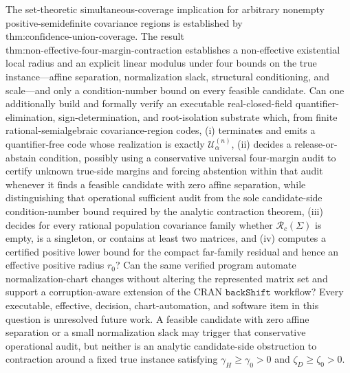 The set-theoretic simultaneous-coverage implication for arbitrary nonempty positive-semidefinite covariance regions is established by \(\text{thm:confidence-union-coverage}\). The result \(\text{thm:non-effective-four-margin-contraction}\) establishes a non-effective existential local radius and an explicit linear modulus under four bounds on the true instance---affine separation, normalization slack, structural conditioning, and scale---and only a condition-number bound on every feasible candidate. Can one additionally build and formally verify an executable real-closed-field quantifier-elimination, sign-determination, and root-isolation substrate which, from finite rational-semialgebraic covariance-region codes, (i) terminates and emits a quantifier-free code whose realization is exactly \(\mathcal U^{(n)}_\alpha\), (ii) decides a release-or-abstain condition, possibly using a conservative universal four-margin audit to certify unknown true-side margins and forcing abstention within that audit whenever it finds a feasible candidate with zero affine separation, while distinguishing that operational sufficient audit from the sole candidate-side condition-number bound required by the analytic contraction theorem, (iii) decides for every rational population covariance family whether \(\mathcal R_c(\Sigma)\) is empty, is a singleton, or contains at least two matrices, and (iv) computes a certified positive lower bound for the compact far-family residual and hence an effective positive radius \(r_0\)? Can the same verified program automate normalization-chart changes without altering the represented matrix set and support a corruption-aware extension of the CRAN \(\texttt{backShift}\) workflow? Every executable, effective, decision, chart-automation, and software item in this question is unresolved future work. A feasible candidate with zero affine separation or a small normalization slack may trigger that conservative operational audit, but neither is an analytic candidate-side obstruction to contraction around a fixed true instance satisfying \(\gamma_H\geq\gamma_0>0\) and \(\zeta_D\geq\zeta_0>0\).